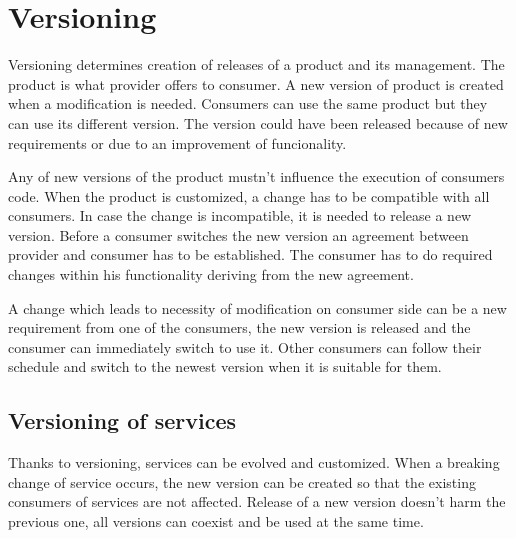 \chapter{Versioning}
\label{chap:versioning}

Versioning determines creation of releases of a product and its management. The product is what provider offers to consumer. A new version of product is created when a modification is needed. Consumers can use the same product but they can use its different version. The version could have been released because of new requirements or due to an improvement of funcionality. 

Any of new versions of the product mustn't influence the execution of consumers code. When the product is customized, a change has to be compatible with all consumers. In case the change is incompatible, it is needed to release a new version. Before a consumer switches the new version an agreement between provider and consumer has to be established. The consumer has to do required changes within his functionality deriving from the new agreement.

A change which leads to necessity of modification on consumer side can be a new requirement from one of the consumers, the new version is released and the consumer can immediately switch to use it. Other consumers can follow their schedule and switch to the newest version when it is suitable for them. 

\section{Versioning of services}
\label{sec:verioningservices}
Thanks to versioning, services can be evolved and customized. When a breaking change of service occurs, the new version can be created so that the existing consumers of services are not affected. Release of a new version doesn't harm the previous one, all versions can coexist and be used at the same time. 



